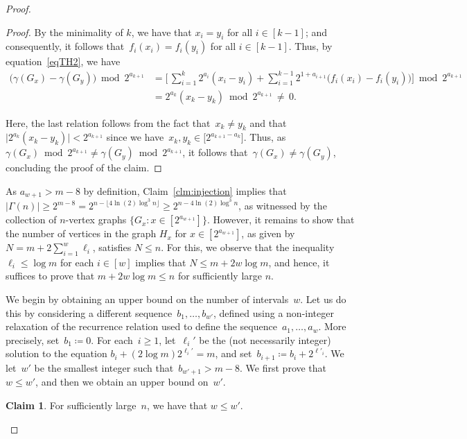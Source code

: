 \documentclass[11pt, final]{article}
\theoremstyle{definition}
\newtheorem{claim}{Claim}[theorem]
\newcommand{\oldqed}{}
\def\endofClaim{\hfill\scalebox{.6}{$\Box$}}
\newenvironment{claimproof}[1][Proof]{
  \renewcommand{\oldqed}{\qedsymbol}
  \renewcommand{\qedsymbol}{\endofClaim}
  \begin{proof}[#1]}
  {\end{proof}
  \renewcommand{\qedsymbol}{\oldqed}}
\begin{document}
\begin{proof}
\begin{claimproof}
        By the minimality of $k$, we have that $x_i = y_i$ for all $i \in [k-1]$; and consequently, it follows that~$f_i(x_i) = f_i(y_i)$ for all $i \in [k-1]$. Thus, by equation~\eqref{eqTH2}, we have 
        \begin{align*}
            \bigl(\gamma(G_x) - \gamma(G_y) \bigr) \bmod 2^{a_{k+1}}&=\Biggl[\,\sum_{i = 1}^k 2^{a_i}(x_i -y_i) + \sum_{i = 1}^{k-1} 2^{1 + a_{i+1}} \bigl(f_i(x_i) - f_i(y_i)\bigr) \Biggr] \bmod 2^{a_{k+1}}\\[0.5em]
            &= 2^{a_k} (x_k - y_k) \bmod 2^{a_{k+1}}\, \neq\, 0.
        \end{align*}
        
        Here, the last relation follows from the fact that~$x_k \neq y_k$ and that $\bigl|2^{a_k}(x_k -y_k)\bigr| < 2^{a_{k+1}}$ since we have~$x_k , y_k \in \bigl[2^{a_{k+1} - a_k}\bigr]$. Thus, as $\gamma(G_x) \bmod{2^{a_{k+1}}} \neq \gamma(G_y) \bmod{2^{a_{k+1}}}$, it follows that~$\gamma(G_x) \neq \gamma(G_y)$, concluding the proof of the claim. 
    \end{claimproof}
     
     As $a_{w+1} > m - 8$ by definition, Claim~\ref{clm:injection} implies that $|\Gamma(n)| \geq 2^{m-8}=2^{n-\lfloor4\ln(2)\log^3 n\rfloor}\ge 2^{n-4\ln(2)\log^3 n}$, as witnessed by the collection of $n$-vertex graphs $\bigl\{G_x : x \in [2^{a_{w+1}}] \bigr\}$. However, it remains to show that the number of vertices in the graph $H_x$ for $x \in [2^{a_{w+1}}]$, as given by $N = m + 2\sum_{i = 1}^w \ell_i$, satisfies $N \leq n$. For this, we observe that the inequality $\ell_i \leq \log m$ for each $i \in [w]$ implies that $N \leq m + 2w \log{m}$, and hence, it suffices to prove that $m + 2w\log m \leq n$ for sufficiently large $n$. 
     
     We begin by obtaining an upper bound on the number of intervals~$w$. Let us do this by considering a different sequence~$b_1, \dots, b_{w'}$, defined using a non-integer relaxation of the recurrence relation used to define the sequence~$a_1, \dots, a_w$. More precisely, set~$b_1 \coloneqq 0$. For each~$i \geq 1$, let~$\ell_i'$ be the (not necessarily integer) solution to the equation $b_i+(2\log m)2^{\ell_i'}=m$, and set~$b_{i+1} \coloneqq b_i+2^{\ell'_i}$. We let~$w'$ be the smallest integer such that~$b_{w'+1}> m-8$. We first prove that~$w\leq w'$, and then we obtain an upper bound on~$w'$.

     \begin{claim}
     \label{clm:wwprime_reln}
     For sufficiently large~$n$, we have that $w \leq w'$.
     \end{claim}


\end{proof}
\end{document}
